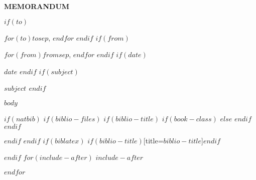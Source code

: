 \documentclass[$if(fontsize)$$fontsize$,$endif$$if(lang)$$lang$,$endif$$if(papersize)$$papersize$,$endif$$for(classoption)$$classoption$$sep$,$endfor$]{$documentclass$}
\newcommand{\doublerule}[1][.4pt]{%
  \noindent
  \makebox[0pt][l]{\rule[.7ex]{\linewidth}{#1}}%
  \rule[.3ex]{\linewidth}{#1}
}
\begin{document}


\begin{center}
\textbf{\LARGE{MEMORANDUM}}
\end{center}
\begin{description}[leftmargin=!,itemsep=3pt,labelwidth=\widthof{\textbf{Subject:}  }]
  $if(to)$
    \item[To:] $for(to)$$to$$sep$, $endfor$
  $endif$
  $if(from)$
    \item[From:] $for(from)$$from$$sep$, $endfor$
  $endif$
  $if(date)$
    \item[Date:] $date$
  $endif$
  $if(subject)$
    \item[Subject:] \bfseries{$subject$}
  $endif$
\end{description}
\vspace{-10pt}
\noindent\makebox[\linewidth]{\doublerule}
\vspace{-25pt}


$body$

%
%
% 

$if(natbib)$
$if(biblio-files)$
$if(biblio-title)$
$if(book-class)$
\renewcommand\bibname{$biblio-title$}
$else$
\renewcommand\refname{$biblio-title$}
$endif$
$endif$


$endif$
$endif$
$if(biblatex)$
\printbibliography$if(biblio-title)$[title=$biblio-title$]$endif$

$endif$
$for(include-after)$
$include-after$

$endfor$
\end{document}
